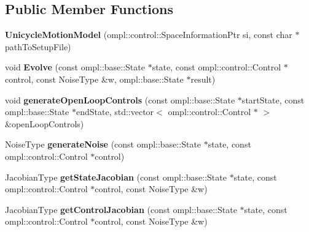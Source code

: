 \subsection*{\-Public \-Member \-Functions}
\begin{DoxyCompactItemize}
\item 
\hypertarget{class_unicycle_motion_model_ab88a5c1f2bb7be9770dd6dd578418c39}{{\bfseries \-Unicycle\-Motion\-Model} (ompl\-::control\-::\-Space\-Information\-Ptr si, const char $\ast$path\-To\-Setup\-File)}\label{class_unicycle_motion_model_ab88a5c1f2bb7be9770dd6dd578418c39}

\item 
\hypertarget{class_unicycle_motion_model_a7d78a6e7de4ad59dbd8aa0e6fd338ca7}{void {\bfseries \-Evolve} (const ompl\-::base\-::\-State $\ast$state, const ompl\-::control\-::\-Control $\ast$control, const \-Noise\-Type \&w, ompl\-::base\-::\-State $\ast$result)}\label{class_unicycle_motion_model_a7d78a6e7de4ad59dbd8aa0e6fd338ca7}

\item 
\hypertarget{class_unicycle_motion_model_adf6f10302c29b5a196628af789e80739}{void {\bfseries generate\-Open\-Loop\-Controls} (const ompl\-::base\-::\-State $\ast$start\-State, const ompl\-::base\-::\-State $\ast$end\-State, std\-::vector$<$ ompl\-::control\-::\-Control $\ast$ $>$ \&open\-Loop\-Controls)}\label{class_unicycle_motion_model_adf6f10302c29b5a196628af789e80739}

\item 
\hypertarget{class_unicycle_motion_model_aff0d7239670e191b7d6ac518952b0428}{\-Noise\-Type {\bfseries generate\-Noise} (const ompl\-::base\-::\-State $\ast$state, const ompl\-::control\-::\-Control $\ast$control)}\label{class_unicycle_motion_model_aff0d7239670e191b7d6ac518952b0428}

\item 
\hypertarget{class_unicycle_motion_model_adb849fef38055401851adf4e87e8ec23}{\-Jacobian\-Type {\bfseries get\-State\-Jacobian} (const ompl\-::base\-::\-State $\ast$state, const ompl\-::control\-::\-Control $\ast$control, const \-Noise\-Type \&w)}\label{class_unicycle_motion_model_adb849fef38055401851adf4e87e8ec23}

\item 
\hypertarget{class_unicycle_motion_model_a422cbf49ce1b509e7f031008483bd6ff}{\-Jacobian\-Type {\bfseries get\-Control\-Jacobian} (const ompl\-::base\-::\-State $\ast$state, const ompl\-::control\-::\-Control $\ast$control, const \-Noise\-Type \&w)}\label{class_unicycle_motion_model_a422cbf49ce1b509e7f031008483bd6ff}


\end{DoxyCompactItemize}
